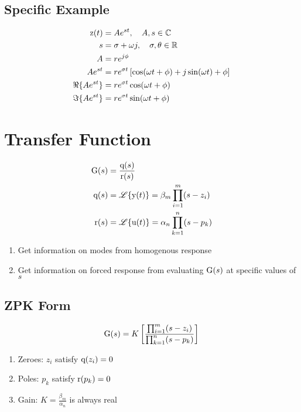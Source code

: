 \documentclass[8pt]{extarticle}
\begin{document}
\begin{multicols*}{3}
\subsection*{Specific Example}
\begin{align*}
    \func{z}[t] &= Ae^{st}, \quad A, s \in \mathbb{C} \\
    s &= \sigma + \omega j, \quad \sigma, \theta \in \mathbb{R} \\
    A &= r e^{j \phi} \\
    Ae^{st} &= r e^{\sigma t} \left[\cos{\omega t + \phi}+j\sin{\omega t} + \phi\right] \\
    \Re{Ae^{st}} &= r e^{\sigma t} \cos{\omega t + \phi} \\
    \Im{Ae^{st}} &= r e^{\sigma t} \sin{\omega t + \phi}
\end{align*}

\section*{Transfer Function}
\begin{align*}
    \func{G}[s] &= \frac{\func{q}[s]}{\func{r}[s]} \\
    \func{q}[s] &= \laplace{\func{y}[t]} = \beta_m \prod_{i=1}^{m}(s-z_i) \\
    \func{r}[s] &= \laplace{\func{u}[t]} = \alpha_n \prod_{k=1}^{n}(s-p_k)
\end{align*}
\begin{enumerate}
    \item Get information on modes from homogenous response
    \item Get information on forced response from evaluating \( \func{G}[s] \) at specific values of \( s \)
\end{enumerate}

\subsection*{ZPK Form}
\[
    \func{G}[s] = K \left[\frac{\prod_{i=1}^{m}(s-z_i)}{\prod_{k=1}^{n}(s-p_k)}\right]
\]
\begin{enumerate}
    \item Zeroes: \( z_i \) satisfy \( \func{q}[z_i] = 0 \)
    \item Poles: \( p_k \) satisfy \( \func{r}[p_k] = 0 \)
    \item Gain: \( K = \frac{\beta_m}{\alpha_n} \) is always real
\end{enumerate}


\end{multicols*}
\end{document}
